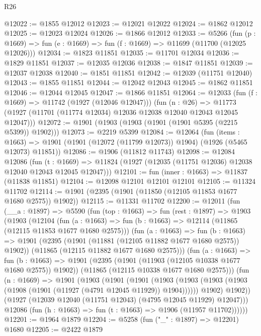 \begin{lexlean}{R26}
\begin{coremodule}
@12022 := @1855 @12012
@12023 := @12021 @12022
@12024 := @1862 @12012
@12025 := @12023 @12024
@12026 := @1866 @12012
@12033 := @5266
    (fun (p : @1669) => fun (e : @1669) => fun (f : @1669) => @11699 (@11700 (@12025 @12026)))
@12034 := @1823 @11851
@12035 := @11701 @12034
@12036 := @1829 @11851
@12037 := @12035 @12036
@12038 := @1847 @11851
@12039 := @12037 @12038
@12040 := @1851 @11851
@12042 := @12039 (@11751 @12040)
@12043 := @1855 @11851
@12044 := @12042 @12043
@12045 := @1862 @11851
@12046 := @12044 @12045
@12047 := @1866 @11851
@12064 := @12033
    (fun (f : @1669) => @11742 (@1927 (@12046 @12047)))
    (fun (n : @26) =>
    @11773 (@1927 (@11701 (@11774 @12034) @12036 @12038 @12040 @12043 @12045 @12047)))
@12072 := @1901 (@1903 (@1903 (@1901 (@1901 @5395 (@2215 @5399)) @1902)))
@12073 := @2219 @5399
@12084 := @12064
    (fun (items : @1663) =>
    @1901 (@1901 (@12072 (@11799 @12073)) @1904) (@1926 (@5465 @12073) @11851))
@12086 := @1906 (@11812 @11743)
@12098 := @12084
    @12086
    (fun (t : @1669) => @11824 (@1927 (@12035 (@11751 @12036) @12038 @12040 @12043 @12045 @12047)))
@12101 := fun (inner : @1663) => @11837 (@11838 @11851)
@12104 := @12098 @12101 @12101 @12101
@12105 := @11324 @11702
@12114 := @1901 (@2395 (@1901 (@11850 (@12105 @11853 @1677 @1680 @2575)) @1902))
@12115 := @11331 @11702
@12200 := @12011
    (fun (__a : @1897) =>
    @5590
      (fun (top : @1663) =>
      fun (rest : @1897) =>
      @1903
        (@1903
          (@12104
            (fun (a : @1663) =>
            fun (b : @1663) => @12114 (@11865 (@12115 @11853 @1677 @1680 @2575)))
            (fun (a : @1663) =>
            fun (b : @1663) =>
            @1901
              (@2395 (@1901 (@11881 (@12105 @11882 @1677 @1680 @2575)) @1902))
              (@11865 (@12115 @11882 @1677 @1680 @2575)))
            (fun (a : @1663) =>
            fun (b : @1663) =>
            @1901
              (@2395 (@1901 (@11903 (@12105 @10338 @1677 @1680 @2575)) @1902))
              (@11865 (@12115 @10338 @1677 @1680 @2575)))
            (fun (n : @1669) =>
            @1901
              (@1903
                (@1901
                  (@1901
                    (@1903
                      (@1903 (@1903 (@1903 (@1908 (@1901 (@11927 (@4791 @12045 @11929)) @1904))))))
                    @1902)
                  @1902))
              (@1927 (@12039 @12040 (@11751 @12043) (@4795 @12045 @11929) @12047)))
            @12086
            (fun (h : @1663) => fun (t : @1663) => @1906 (@11957 @11702))))))
@12201 := @1964 @1879
@12204 := @5258 (fun ("_" : @1897) => @12201) @1680
@12205 := @2422 @1879

\end{coremodule}
\end{lexlean}
